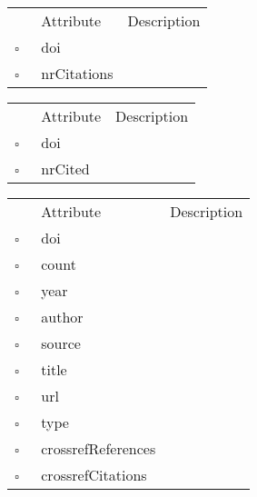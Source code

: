 \begin{table}
\caption{MissingCitedWork  }

\begin{longtable}{llp{8cm}}
& Attribute & Description \\
$\square$\ & doi &  \\
$\square$\ & nrCitations &  \\
\end{longtable}
\label{attr:MissingCitedWork}
\end{table}

\begin{table}
\caption{MissingCitingWork  }

\begin{longtable}{llp{8cm}}
& Attribute & Description \\
$\square$\ & doi &  \\
$\square$\ & nrCited &  \\
\end{longtable}
\label{attr:MissingCitingWork}
\end{table}

\begin{table}
\caption{MissingCross  }

\begin{longtable}{llp{8cm}}
& Attribute & Description \\
$\square$\ & doi &  \\
$\square$\ & count &  \\
$\square$\ & year &  \\
$\square$\ & author &  \\
$\square$\ & source &  \\
$\square$\ & title &  \\
$\square$\ & url &  \\
$\square$\ & type &  \\
$\square$\ & crossrefReferences &  \\
$\square$\ & crossrefCitations &  \\
\end{longtable}
\label{attr:MissingCross}
\end{table}


